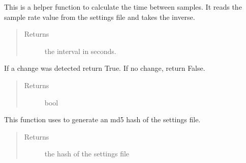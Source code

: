 \documentclass[letterpaper,10pt,english]{sphinxmanual}
\begin{document}

\begin{fulllineitems}
\label{\detokenize{plotGUI:plotGUI.get_interval}}
This is a helper function to calculate the time between samples.
It reads the sample rate value from the settings file and takes the inverse.
\begin{quote}\begin{description}
\item[{Returns}] \leavevmode
the interval in seconds.

\end{description}\end{quote}

\end{fulllineitems}


\begin{fulllineitems}
\label{\detokenize{plotGUI:plotGUI.check_for_change}}
If a change was detected return True. If no change, return False.
\begin{quote}\begin{description}
\item[{Returns}] \leavevmode
bool

\end{description}\end{quote}

\end{fulllineitems}


\begin{fulllineitems}
\label{\detokenize{plotGUI:plotGUI.get_hash}}
This function uses  to generate an md5 hash of the settings file.
\begin{quote}\begin{description}
\item[{Returns}] \leavevmode
the hash of the settings file

\end{description}\end{quote}

\end{fulllineitems}
\end{document}
